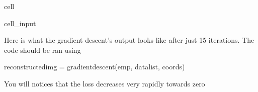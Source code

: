 \documentclass[letterpaper,10pt,english]{jupyterBook}
\begin{document}
\begin{sphinxuseclass}{cell}
\begin{sphinxVerbatimInput}
\begin{sphinxuseclass}{cell_input}
\begin{sphinxVerbatim}[commandchars=\\\{\}]
      \PYG{p}{[}    \PYG{p}{]}
     

     
\end{sphinxVerbatim}

\end{sphinxuseclass}\end{sphinxVerbatimInput}

\end{sphinxuseclass}
\sphinxAtStartPar
Here is what the gradient descent’s output looks like after just 15 iterations. The code should be ran using

\begin{sphinxVerbatim}[commandchars=\\\{\}]
reconstructed\PYGZus{}img = gradient\PYGZus{}descent(emp, data\PYGZus{}list, coords)
\end{sphinxVerbatim}

\sphinxAtStartPar
You will notices that the loss decreases very rapidly towards zero
\end{document}

